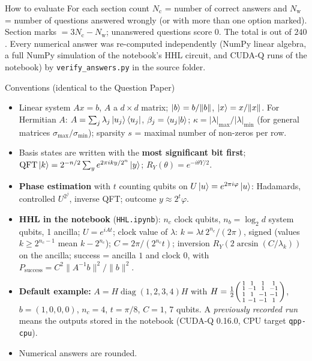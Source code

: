 \documentclass[11pt,a4paper]{article}
\begin{document}
\begin{infobox}{How to evaluate}
For each section count $N_{\mathrm c}$ = number of correct answers and $N_{\mathrm w}$ = number of questions answered wrongly (or with more than one option marked). Section marks $= 3N_{\mathrm c} - N_{\mathrm w}$; unanswered questions score $0$. The total is out of $240$.
Every numerical answer was re-computed independently (NumPy linear algebra, a full NumPy simulation of the notebook's HHL circuit, and CUDA-Q runs of the notebook) by
\texttt{verify\_answers.py} in the source folder.
\end{infobox}
\begin{infobox}{Conventions (identical to the Question Paper)}

\begin{itemize}[leftmargin=1.2em, itemsep=1pt, topsep=2pt]
\item Linear system $Ax = b$, $A$ a $d\times d$ matrix; $\ket b = b/\|b\|$, $\ket x = x/\|x\|$. For Hermitian $A$: $A = \sum_j\lambda_j\ket{u_j}\bra{u_j}$, $\beta_j = \braket{u_j|b}$;
      $\kappa = |\lambda|_{\max}/|\lambda|_{\min}$ (for general matrices $\sigma_{\max}/\sigma_{\min}$); sparsity $s$ = maximal number of non-zeros per row.
\item Basis states are written with the \textbf{most significant bit first}; $\mathrm{QFT}\ket k = 2^{-n/2}\sum_y e^{2\pi iky/2^n}\ket y$; $R_Y(\theta) = e^{-i\theta Y/2}$.
\item \textbf{Phase estimation} with $t$ counting qubits on $U\ket u = e^{2\pi i\varphi}\ket u$: Hadamards, controlled $U^{2^j}$, inverse QFT; outcome $y \approx 2^t\varphi$.
\item \textbf{HHL in the notebook} (\texttt{HHL.ipynb}): $n_c$ clock qubits, $n_b = \log_2d$ system qubits, 1 ancilla; $U = e^{iAt}$; clock value of $\lambda$:
      $k = \lambda t\,2^{n_c}/(2\pi)$, signed (values $k \ge 2^{n_c-1}$ mean $k - 2^{n_c}$); $C = 2\pi/(2^{n_c}t)$; inversion $R_Y(2\arcsin(C/\lambda_k))$ on the ancilla;
      success = ancilla $1$ and clock $0$, with $P_{\text{success}} = C^2\|A^{-1}b\|^2/\|b\|^2$.
\item \textbf{Default example:} $A = H\operatorname{diag}(1, 2, 3, 4)H$ with $H = \tfrac12\begin{psmallmatrix}1&1&1&1\\1&-1&1&-1\\1&1&-1&-1\\1&-1&-1&1\end{psmallmatrix}$, $b = (1, 0, 0, 0)$, $n_c = 4$, $t = \pi/8$, $C = 1$,
      7 qubits. A \emph{previously recorded run} means the outputs stored in the notebook (CUDA-Q 0.16.0, CPU target \texttt{qpp-cpu}).
\item Numerical answers are rounded.
\end{itemize}
\end{infobox}
\newpage
\end{document}

